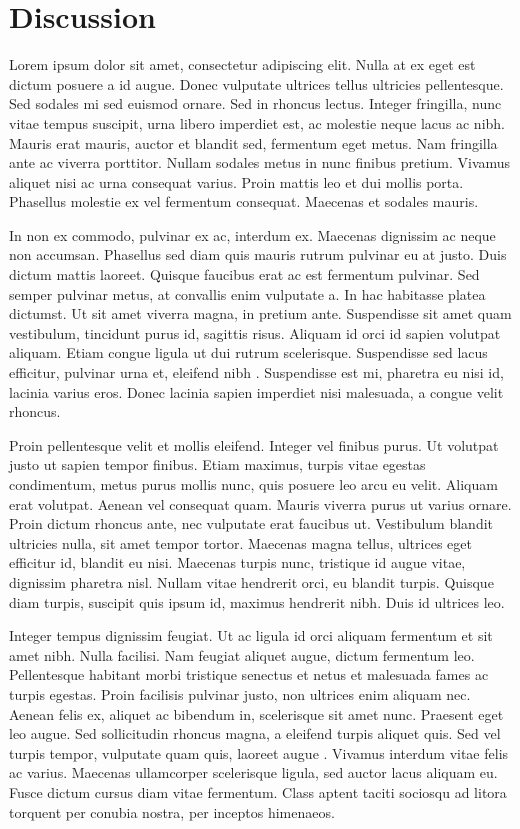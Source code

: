 \chapter{Discussion}

Lorem ipsum dolor sit amet, consectetur adipiscing elit. Nulla at ex eget est dictum posuere a id augue. Donec vulputate ultrices tellus ultricies pellentesque. Sed sodales mi sed euismod ornare. Sed in rhoncus lectus. Integer fringilla, nunc vitae tempus suscipit, urna libero imperdiet est, ac molestie neque lacus ac nibh. Mauris erat mauris, auctor et blandit sed, fermentum eget metus. Nam fringilla ante ac viverra porttitor. Nullam sodales metus in nunc finibus pretium. Vivamus aliquet nisi ac urna consequat varius. Proin mattis leo et dui mollis porta. Phasellus molestie ex vel fermentum consequat. Maecenas et sodales mauris.

In non ex commodo, pulvinar ex ac, interdum ex. Maecenas dignissim ac neque non accumsan. Phasellus sed diam quis mauris rutrum pulvinar eu at justo. Duis dictum mattis laoreet. Quisque faucibus erat ac est fermentum pulvinar. Sed semper pulvinar metus, at convallis enim vulputate a. In hac habitasse platea dictumst. Ut sit amet viverra magna, in pretium ante. Suspendisse sit amet quam vestibulum, tincidunt purus id, sagittis risus. Aliquam id orci id sapien volutpat aliquam. Etiam congue ligula ut dui rutrum scelerisque. Suspendisse sed lacus efficitur, pulvinar urna et, eleifend nibh \citep{example_ref1}. Suspendisse est mi, pharetra eu nisi id, lacinia varius eros. Donec lacinia sapien imperdiet nisi malesuada, a congue velit rhoncus.

Proin pellentesque velit et mollis eleifend. Integer vel finibus purus. Ut volutpat justo ut sapien tempor finibus. Etiam maximus, turpis vitae egestas condimentum, metus purus mollis nunc, quis posuere leo arcu eu velit. Aliquam erat volutpat. Aenean vel consequat quam. Mauris viverra purus ut varius ornare. Proin dictum rhoncus ante, nec vulputate erat faucibus ut. Vestibulum blandit ultricies nulla, sit amet tempor tortor. Maecenas magna tellus, ultrices eget efficitur id, blandit eu nisi. Maecenas turpis nunc, tristique id augue vitae, dignissim pharetra nisl. Nullam vitae hendrerit orci, eu blandit turpis. Quisque diam turpis, suscipit quis ipsum id, maximus hendrerit nibh. Duis id ultrices leo.

Integer tempus dignissim feugiat. Ut ac ligula id orci aliquam fermentum et sit amet nibh. Nulla facilisi. Nam feugiat aliquet augue, dictum fermentum leo. Pellentesque habitant morbi tristique senectus et netus et malesuada fames ac turpis egestas. Proin facilisis pulvinar justo, non ultrices enim aliquam nec. Aenean felis ex, aliquet ac bibendum in, scelerisque sit amet nunc. Praesent eget leo augue. Sed sollicitudin rhoncus magna, a eleifend turpis aliquet quis. Sed vel turpis tempor, vulputate quam quis, laoreet augue \citep{example_ref2}. Vivamus interdum vitae felis ac varius. Maecenas ullamcorper scelerisque ligula, sed auctor lacus aliquam eu. Fusce dictum cursus diam vitae fermentum. Class aptent taciti sociosqu ad litora torquent per conubia nostra, per inceptos himenaeos.

